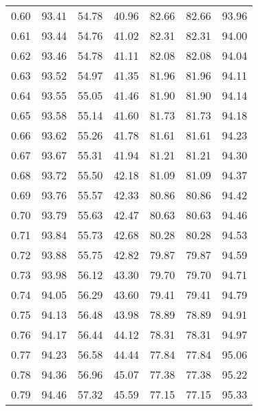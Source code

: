 \begin{tabular}{|c|c|c|c|c|c|c|}
      0.60 &     93.41 &     54.78 &      40.96 &   82.66 &      82.66 &         93.96 \\
      0.61 &     93.44 &     54.76 &      41.02 &   82.31 &      82.31 &         94.00 \\
      0.62 &     93.46 &     54.78 &      41.11 &   82.08 &      82.08 &         94.04 \\
      0.63 &     93.52 &     54.97 &      41.35 &   81.96 &      81.96 &         94.11 \\
      0.64 &     93.55 &     55.05 &      41.46 &   81.90 &      81.90 &         94.14 \\
      0.65 &     93.58 &     55.14 &      41.60 &   81.73 &      81.73 &         94.18 \\
      0.66 &     93.62 &     55.26 &      41.78 &   81.61 &      81.61 &         94.23 \\
      0.67 &     93.67 &     55.31 &      41.94 &   81.21 &      81.21 &         94.30 \\
      0.68 &     93.72 &     55.50 &      42.18 &   81.09 &      81.09 &         94.37 \\
      0.69 &     93.76 &     55.57 &      42.33 &   80.86 &      80.86 &         94.42 \\
      0.70 &     93.79 &     55.63 &      42.47 &   80.63 &      80.63 &         94.46 \\
      0.71 &     93.84 &     55.73 &      42.68 &   80.28 &      80.28 &         94.53 \\
      0.72 &     93.88 &     55.75 &      42.82 &   79.87 &      79.87 &         94.59 \\
      0.73 &     93.98 &     56.12 &      43.30 &   79.70 &      79.70 &         94.71 \\
      0.74 &     94.05 &     56.29 &      43.60 &   79.41 &      79.41 &         94.79 \\
      0.75 &     94.13 &     56.48 &      43.98 &   78.89 &      78.89 &         94.91 \\
      0.76 &     94.17 &     56.44 &      44.12 &   78.31 &      78.31 &         94.97 \\
      0.77 &     94.23 &     56.58 &      44.44 &   77.84 &      77.84 &         95.06 \\
      0.78 &     94.36 &     56.96 &      45.07 &   77.38 &      77.38 &         95.22 \\
      0.79 &     94.46 &     57.32 &      45.59 &   77.15 &      77.15 &         95.33 \\

\end{tabular}
